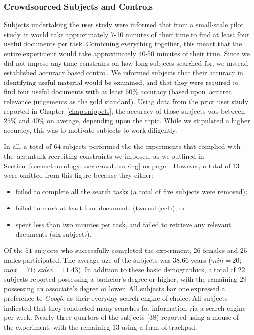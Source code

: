 \subsubsection{Crowdsourced Subjects and Controls}
Subjects undertaking the user study were informed that from a small-scale pilot study, it would take approximately 7-10 minutes of their time to find at least four useful documents per task. Combining everything together, this meant that the entire experiment would take approximately 40-50 minutes of their time. Since we did not impose any time constrains on how long subjects searched for, we instead established accuracy based control. We informed subjects that their accuracy in identifying useful material would be examined, and that they were required to find four useful documents with at least $50\%$ accuracy (based upon~\gls{acr:trec} relevance judgements as the gold standard). Using data from the prior user study reported in Chapter~\ref{chap:snippets}, the accuracy of those subjects was between $25\%$ and $40\%$ on average, depending upon the topic. While we stipulated a higher accuracy, this was to motivate subjects to work diligently.

In all, a total of $64$ subjects performed the the experiments that complied with the~\gls{acr:mturk} recruiting constraints we imposed, as we outlined in Section~\ref{sec:methodology:user:crowdsourcing} on page~\pageref{sec:methodology:user:crowdsourcing}. However, a total of $13$ were omitted from this figure because they either:

\begin{itemize}
    \item{failed to complete all the search tasks (a total of five subjects were removed);}
    \item{failed to mark at least four documents (two subjects); or}
    \item{spent less than two minutes per task, and failed to retrieve any relevant documents (six subjects).}
\end{itemize}

Of the $51$ subjects who successfully completed the experiment, $26$ females and $25$ males participated. The average age of the subjects was $38.66$ years ($min=20$; $max=71$; $stdev=11.43$). In addition to these basic demographics, a total of $22$ subjects reported possessing a bachelor's degree or higher, with the remaining $29$ possessing an associate's degree or lower. All subjects bar one expressed a preference to \emph{Google} as their everyday search engine of choice. All subjects indicated that they conducted many searches for information via a search engine per week. Nearly three quarters of the subjects ($38$) reported using a mouse of the experiment, with the remaining $13$ using a form of trackpad.

